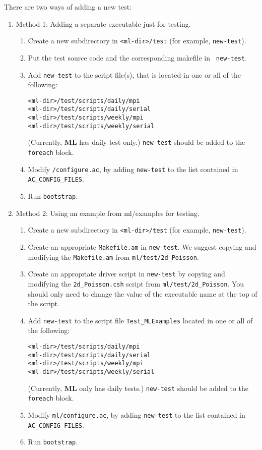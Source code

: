 \documentclass[10pt,letter,relax]{SANDreport}
\newcommand{\ML}     {{\bf ML }}
\begin{document}
There are two ways of adding a new test:
\begin{enumerate}
\item Method 1: Adding a separate executable just for testing.
\begin{enumerate}
\item Create a new subdirectory in \verb!<ml-dir>/test! (for example,
  {\tt new-test}).
\item Put the test source code and the corresponding makefile in {\tt
    new-test}.
\item Add {\tt new-test} to the script file(s), that is located in one or all
of the following:
\begin{verbatim}
<ml-dir>/test/scripts/daily/mpi
<ml-dir>/test/scripts/daily/serial
<ml-dir>/test/scripts/weekly/mpi
<ml-dir>/test/scripts/weekly/serial
\end{verbatim}
(Currently, \ML has daily test only.) {\tt new-test} should be added to
the {\tt foreach} block.
\item Modify {\tt <ml-dir>/configure.ac}, by adding {\tt new-test} to
  the list contained in {\tt AC\_CONFIG\_FILES}.
\item Run {\tt bootstrap}.
\end{enumerate}
\item Method 2: Using an example from ml/examples for testing.
\begin{enumerate}
\item Create a new subdirectory in \verb!<ml-dir>/test! (for example,
  {\tt new-test}).
\item Create an appropriate \verb!Makefile.am! in {\tt new-test}.
We suggest copying and modifying the \verb!Makefile.am! from
\verb!ml/test/2d_Poisson!.
\item Create an appropriate driver script in {\tt new-test} by
copying and modifying the \verb!2d_Poisson.csh! script from
\verb!ml/test/2d_Poisson!.
You should only need to change the value of the executable name at the top
of the script.
\item Add {\tt new-test} to the script file \verb!Test_MLExamples! located in
one or all of the following:
\begin{verbatim}
<ml-dir>/test/scripts/daily/mpi
<ml-dir>/test/scripts/daily/serial
<ml-dir>/test/scripts/weekly/mpi
<ml-dir>/test/scripts/weekly/serial
\end{verbatim}
(Currently, \ML only has daily tests.) {\tt new-test} should be added to
the {\tt foreach} block.
\item Modify {\tt ml/configure.ac}, by adding {\tt new-test} to
  the list contained in {\tt AC\_CONFIG\_FILES}.
\item Run {\tt bootstrap}.
\end{enumerate}
\end{enumerate}
\end{document}
